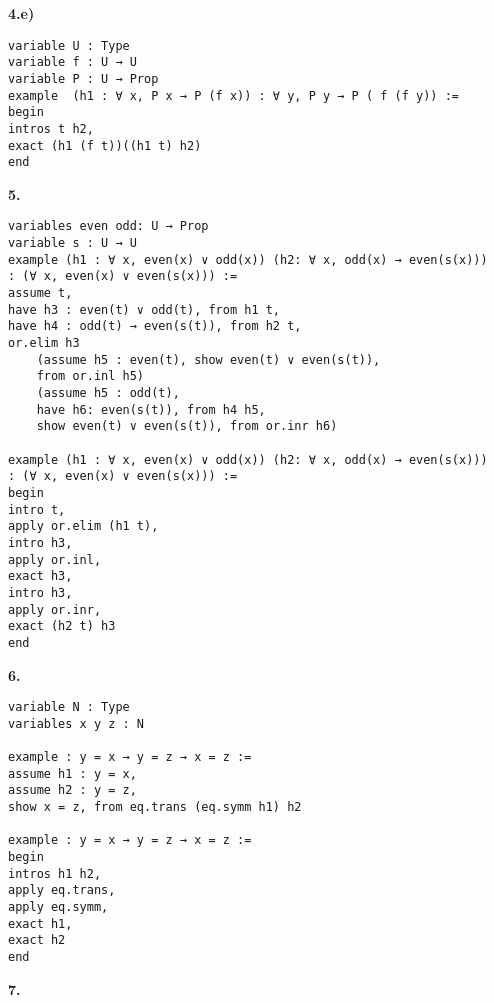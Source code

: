 \textbf{4.e)}
\begin{lstlisting}
variable U : Type
variable f : U → U
variable P : U → Prop
example  (h1 : ∀ x, P x → P (f x)) : ∀ y, P y → P ( f (f y)) :=
begin
intros t h2,
exact (h1 (f t))((h1 t) h2)
end  
\end{lstlisting}
\textbf{5.}
\begin{lstlisting}
variables even odd: U → Prop
variable s : U → U
example (h1 : ∀ x, even(x) ∨ odd(x)) (h2: ∀ x, odd(x) → even(s(x))) 
: (∀ x, even(x) ∨ even(s(x))) :=
assume t,
have h3 : even(t) ∨ odd(t), from h1 t,
have h4 : odd(t) → even(s(t)), from h2 t,
or.elim h3
    (assume h5 : even(t), show even(t) ∨ even(s(t)), 
    from or.inl h5)
    (assume h5 : odd(t),
    have h6: even(s(t)), from h4 h5,
    show even(t) ∨ even(s(t)), from or.inr h6)
    
example (h1 : ∀ x, even(x) ∨ odd(x)) (h2: ∀ x, odd(x) → even(s(x))) 
: (∀ x, even(x) ∨ even(s(x))) :=
begin
intro t,
apply or.elim (h1 t),
intro h3,
apply or.inl,
exact h3,
intro h3,
apply or.inr,
exact (h2 t) h3
end  
\end{lstlisting}
\textbf{6.}
\begin{lstlisting}
variable N : Type
variables x y z : N
    
example : y = x → y = z → x = z :=
assume h1 : y = x,
assume h2 : y = z,
show x = z, from eq.trans (eq.symm h1) h2
    
example : y = x → y = z → x = z :=
begin
intros h1 h2,
apply eq.trans,
apply eq.symm,
exact h1,
exact h2
end
\end{lstlisting}
\textbf{7.}
